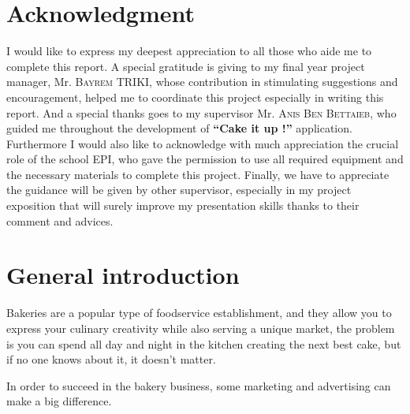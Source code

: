 \documentclass[12pt,a4paper]{report}
\begin{document}
	
	\setcounter{page}{1}
	
	\chapter*{\centering Acknowledgment}
	
	I would like to express my deepest appreciation to all those who aide me to complete this report.  A special gratitude is giving to my final year project  manager, Mr. \textsc{Bayrem TRIKI}, whose contribution in stimulating suggestions and encouragement,  helped me to coordinate this project especially in writing this report. And a special thanks goes to my supervisor Mr. \textsc{Anis Ben Bettaieb}, who guided me throughout the development of  \textbf{``Cake it up !''} application.\\
	
	Furthermore I would also like to acknowledge with much appreciation the crucial role of the school EPI, who gave the permission to use all required  equipment and the necessary materials to complete this project. Finally, we have to appreciate the guidance will be given by other supervisor, especially in my project exposition that will surely improve my presentation skills thanks to their comment and advices.
	
	
	\tableofcontents
	\cleardoublepage
	\listoffigures	
	\cleardoublepage
	\listoftables	
	\clearpage 
	
	\setcounter{page}{1}
	
	
	\chapter*{\centering General introduction}
	Bakeries are a popular type of foodservice establishment, and they allow you to express your culinary creativity while also serving a unique market, the problem is you can spend all day and night in the kitchen creating the next best cake, but if no one knows about it, it doesn’t matter.  \par 
	In order to succeed in the bakery business,  some marketing and advertising can make a big difference.\par
	
\end{document}
